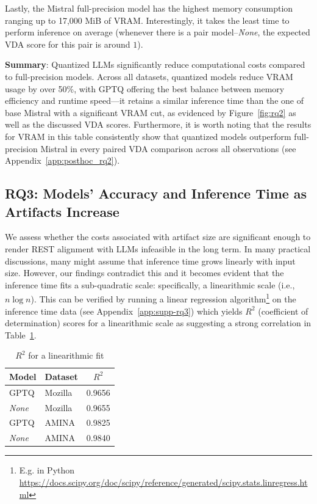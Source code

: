 \documentclass[conference]{IEEEtran}
\begin{document}
Lastly, the Mistral full-precision model has the highest memory consumption ranging up to 17,000 MiB of VRAM. Interestingly, it takes the least time to perform inference on average (whenever there is a pair model--\textit{None}, the expected VDA score for this pair is around $1$).

\textbf{Summary}: Quantized LLMs significantly reduce computational costs compared to full-precision models. Across all datasets, quantized models reduce VRAM usage by over 50\%, with GPTQ offering the best balance between memory efficiency and runtime speed---it retains a similar inference time than the one of base Mistral with a significant VRAM cut, as evidenced by Figure~\ref{fig:rq2} as well as the discussed VDA scores. Furthermore, it is worth noting that the results for VRAM in this table consistently show that quantized models outperform full-precision Mistral in every paired VDA comparison across all observations (see Appendix~\ref{app:posthoc_rq2}).

% 
% 
% 

\subsection{\textbf{RQ3:} Models' Accuracy and Inference Time as Artifacts Increase}

We assess whether the costs associated with artifact size are significant enough to render REST alignment with LLMs infeasible in the long term. In many practical discussions, many might assume that inference time grows linearly with input size. However, our findings contradict this and it becomes evident that the inference time fits a sub-quadratic scale: specifically, a linearithmic scale (i.e., $n \log n$). This can be verified by running a linear regression algorithm\footnote{E.g. in Python \url{https://docs.scipy.org/doc/scipy/reference/generated/scipy.stats.linregress.html}} on the inference time data (see Appendix~\ref{app:supp-rq3}) which yields $R^2$ (coefficient of determination) scores for a linearithmic scale as suggesting a strong correlation in Table~\ref{tab:rsquared}.

\begin{table}[H]
    \centering
    \begin{tabular}{llc}
    \toprule
    \textbf{Model} & \textbf{Dataset} & \boldmath$R^2$ \\
    \midrule
    GPTQ & Mozilla & 0.9656 \\
    \textit{None}  & Mozilla & 0.9655 \\
    GPTQ & AMINA   & 0.9825 \\
    \textit{None}  & AMINA   & 0.9840 \\
    \bottomrule
    \end{tabular}
    \caption{$R^2$ for a linearithmic fit}
    \label{tab:rsquared}
\end{table}
\end{document}
